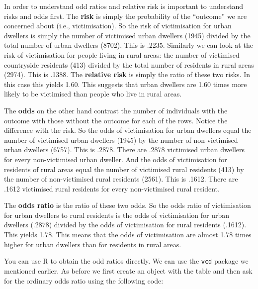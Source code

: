 \documentclass[
]{book}
\newenvironment{Shaded}{\begin{snugshade}}{\end{snugshade}}
\newcommand{\AttributeTok}[1]{\textcolor[rgb]{0.77,0.63,0.00}{#1}}
\newcommand{\ConstantTok}[1]{\textcolor[rgb]{0.00,0.00,0.00}{#1}}
\newcommand{\FloatTok}[1]{\textcolor[rgb]{0.00,0.00,0.81}{#1}}
\newcommand{\FunctionTok}[1]{\textcolor[rgb]{0.00,0.00,0.00}{#1}}
\newcommand{\NormalTok}[1]{#1}
\newcommand{\OtherTok}[1]{\textcolor[rgb]{0.56,0.35,0.01}{#1}}
\newcommand{\SpecialCharTok}[1]{\textcolor[rgb]{0.00,0.00,0.00}{#1}}
\begin{document}
In order to understand odd ratios and relative risk is important to understand risks and odds first. The \textbf{risk} is simply the probability of the ``outcome'' we are concerned about (i.e., victimisation). So the risk of victimisation for urban dwellers is simply the number of victimised urban dwellers (1945) divided by the total number of urban dwellers (8702). This is .2235. Similarly we can look at the risk of victimisation for people living in rural areas: the number of victimised countryside residents (413) divided by the total number of residents in rural areas (2974). This is .1388. The \textbf{relative risk} is simply the ratio of these two risks. In this case this yields 1.60. This suggests that urban dwellers are 1.60 times more likely to be victimised than people who live in rural areas.

The \textbf{odds} on the other hand contrast the number of individuals with the outcome with those without the outcome for each of the rows. Notice the difference with the risk. So the odds of victimisation for urban dwellers equal the number of victimised urban dwellers (1945) by the number of non-victimised urban dwellers (6757). This is .2878. There are .2878 victimised urban dwellers for every non-victimised urban dweller. And the odds of victimisation for residents of rural areas equal the number of victimised rural residents (413) by the number of non-victimised rural residents (2561). This is .1612. There are .1612 victimised rural residents for every non-victimised rural resident.

The \textbf{odds ratio} is the ratio of these two odds. So the odds ratio of victimisation for urban dwellers to rural residents is the odds of victimisation for urban dwellers (.2878) divided by the odds of victimisation for rural residents (.1612). This yields 1.78. This means that the odds of victimisation are almost 1.78 times higher for urban dwellers than for residents in rural areas.

You can use R to obtain the odd ratios directly. We can use the \texttt{vcd} package we mentioned earlier. As before we first create an object with the table and then ask for the ordinary odds ratio using the following code:

\begin{Shaded}
\end{Shaded}
\end{document}
